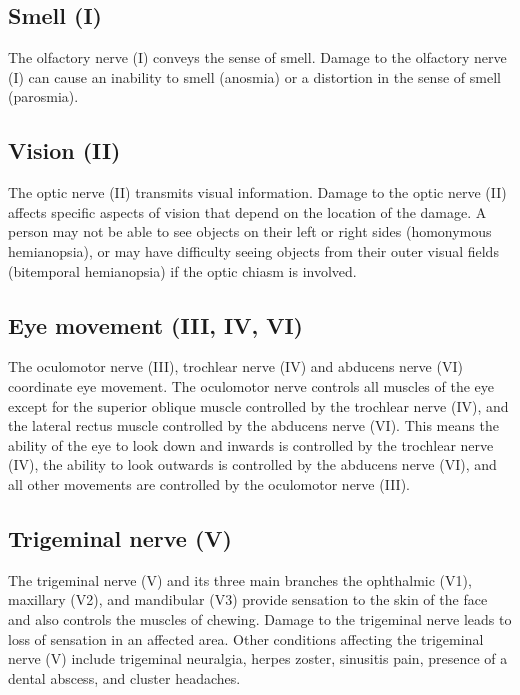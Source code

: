 \hypertarget{smell-i}{%
\subsection{Smell (I)}\label{smell-i}}

The olfactory nerve (I) conveys the sense of smell. Damage to the olfactory nerve (I) can cause an inability to smell (anosmia) or a distortion in the sense of smell (parosmia).

\hypertarget{vision-ii}{%
\subsection{Vision (II)}\label{vision-ii}}

The optic nerve (II) transmits visual information. Damage to the optic nerve (II) affects specific aspects of vision that depend on the location of the damage. A person may not be able to see objects on their left or right sides (homonymous hemianopsia), or may have difficulty seeing objects from their outer visual fields (bitemporal hemianopsia) if the optic chiasm is involved.

\hypertarget{eye-movement-iii-iv-vi}{%
\subsection{Eye movement (III, IV, VI)}\label{eye-movement-iii-iv-vi}}

The oculomotor nerve (III), trochlear nerve (IV) and abducens nerve (VI) coordinate eye movement. The oculomotor nerve controls all muscles of the eye except for the superior oblique muscle controlled by the trochlear nerve (IV), and the lateral rectus muscle controlled by the abducens nerve (VI). This means the ability of the eye to look down and inwards is controlled by the trochlear nerve (IV), the ability to look outwards is controlled by the abducens nerve (VI), and all other movements are controlled by the oculomotor nerve (III).

\hypertarget{trigeminal-nerve-v}{%
\subsection{Trigeminal nerve (V)}\label{trigeminal-nerve-v}}

The trigeminal nerve (V) and its three main branches the ophthalmic (V1), maxillary (V2), and mandibular (V3) provide sensation to the skin of the face and also controls the muscles of chewing. Damage to the trigeminal nerve leads to loss of sensation in an affected area. Other conditions affecting the trigeminal nerve (V) include trigeminal neuralgia, herpes zoster, sinusitis pain, presence of a dental abscess, and cluster headaches.

